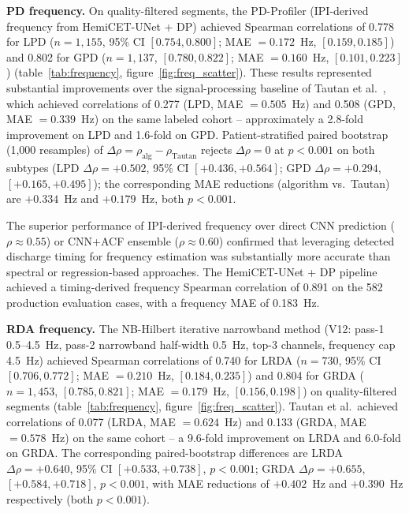 \documentclass{iopjournal}
\begin{document}
\textbf{PD frequency.} On quality-filtered segments, the PD-Profiler (IPI-derived frequency from HemiCET-UNet + DP) achieved Spearman correlations of 0.778 for LPD ($n = 1{,}155$, 95\% CI $[0.754, 0.800]$; MAE $= 0.172$~Hz, $[0.159, 0.185]$) and 0.802 for GPD ($n = 1{,}137$, $[0.780, 0.822]$; MAE $= 0.160$~Hz, $[0.101, 0.223]$) (table~\ref{tab:frequency}, figure~\ref{fig:freq_scatter}). These results represented substantial improvements over the signal-processing baseline of Tautan et al.~\cite{tautan2025}, which achieved correlations of 0.277 (LPD, MAE $= 0.505$~Hz) and 0.508 (GPD, MAE $= 0.339$~Hz) on the same labeled cohort -- approximately a 2.8-fold improvement on LPD and 1.6-fold on GPD. Patient-stratified paired bootstrap (1{,}000 resamples) of $\Delta\rho = \rho_\mathrm{alg} - \rho_\mathrm{Tautan}$ rejects $\Delta\rho = 0$ at $p<0.001$ on both subtypes (LPD $\Delta\rho = +0.502$, 95\% CI $[+0.436, +0.564]$; GPD $\Delta\rho = +0.294$, $[+0.165, +0.495]$); the corresponding MAE reductions (algorithm vs.\ Tautan) are $+0.334$~Hz and $+0.179$~Hz, both $p<0.001$.

The superior performance of IPI-derived frequency over direct CNN prediction ($\rho \approx 0.55$) or CNN+ACF ensemble ($\rho \approx 0.60$) confirmed that leveraging detected discharge timing for frequency estimation was substantially more accurate than spectral or regression-based approaches. The HemiCET-UNet + DP pipeline achieved a timing-derived frequency Spearman correlation of 0.891 on the 582 production evaluation cases, with a frequency MAE of 0.183~Hz.

\textbf{RDA frequency.} The NB-Hilbert iterative narrowband method (V12: pass-1 0.5--4.5~Hz, pass-2 narrowband half-width 0.5~Hz, top-3 channels, frequency cap 4.5~Hz) achieved Spearman correlations of 0.740 for LRDA ($n = 730$, 95\% CI $[0.706, 0.772]$; MAE $= 0.210$~Hz, $[0.184, 0.235]$) and 0.804 for GRDA ($n = 1{,}453$, $[0.785, 0.821]$; MAE $= 0.179$~Hz, $[0.156, 0.198]$) on quality-filtered segments (table~\ref{tab:frequency}, figure~\ref{fig:freq_scatter}). Tautan et al.\ achieved correlations of 0.077 (LRDA, MAE $= 0.624$~Hz) and 0.133 (GRDA, MAE $= 0.578$~Hz) on the same cohort -- a 9.6-fold improvement on LRDA and 6.0-fold on GRDA. The corresponding paired-bootstrap differences are LRDA $\Delta\rho = +0.640$, 95\% CI $[+0.533, +0.738]$, $p<0.001$; GRDA $\Delta\rho = +0.655$, $[+0.584, +0.718]$, $p<0.001$, with MAE reductions of $+0.402$~Hz and $+0.390$~Hz respectively (both $p<0.001$).
\end{document}
